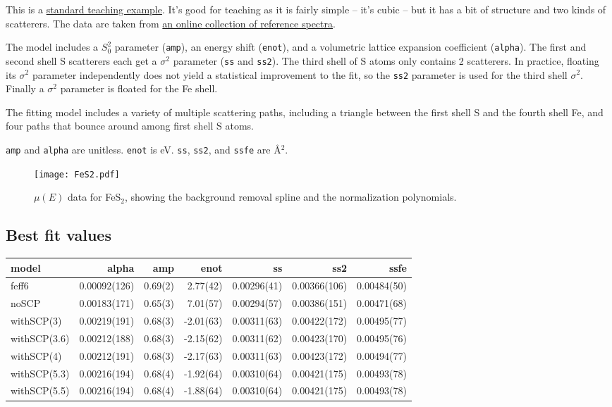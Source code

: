 \documentclass[11pt]{article}
\begin{document}
This is a
\href{https://github.com/bruceravel/XAS-Education/tree/master/Examples/FeS2}{standard
  teaching example}. It's good for teaching as it is fairly simple --
it's cubic -- but it has a bit of structure and two kinds of
scatterers.  The data are taken from
\href{http://cars.uchicago.edu/~newville/ModelLib/search.html}{an
  online collection of reference spectra}.

The model includes a $S_0^2$ parameter (\texttt{amp}), an energy shift
(\texttt{enot}), and a volumetric lattice expansion coefficient
(\texttt{alpha}). The first and second shell S scatterers each get a
$\sigma^2$ parameter (\texttt{ss} and \texttt{ss2}). The third shell
of S atoms only contains 2 scatterers. In practice, floating its
$\sigma^2$ parameter independently does not yield a statistical
improvement to the fit, so the \texttt{ss2} parameter is used for the
third shell $\sigma^2$.  Finally a $\sigma^2$ parameter is floated for
the Fe shell.

The fitting model includes a variety of multiple scattering paths,
including a triangle between the first shell S and the fourth shell
Fe, and four paths that bounce around among first shell S atoms.

\texttt{amp} and \texttt{alpha} are unitless. \texttt{enot} is
eV. \texttt{ss}, \texttt{ss2}, and \texttt{ssfe} are {\AA}$^2$.

\begin{figure}[h]
  \centering
  \texttt{[image: FeS2.pdf]} 
  \caption{$\mu(E)$ data for FeS$_2$, showing the background
    removal spline and the normalization polynomials.}
  \label{fig:fes2-data}
\end{figure}


\subsection{Best fit values}
\label{sec:orgheadline14}

\begin{center}
  \footnotesize
  \begin{tabular}{lrrrrrr}
    model & alpha & amp & enot & ss & ss2 & ssfe\\
    \hline
    feff6        & 0.00092(126) & 0.69(2) &  2.77(42) & 0.00296(41) & 0.00366(106) & 0.00484(50)\\
    noSCP        & 0.00183(171) & 0.65(3) &  7.01(57) & 0.00294(57) & 0.00386(151) & 0.00471(68)\\
    withSCP(3)   & 0.00219(191) & 0.68(3) & -2.01(63) & 0.00311(63) & 0.00422(172) & 0.00495(77)\\
    withSCP(3.6) & 0.00212(188) & 0.68(3) & -2.15(62) & 0.00311(62) & 0.00423(170) & 0.00495(76)\\
    withSCP(4)   & 0.00212(191) & 0.68(3) & -2.17(63) & 0.00311(63) & 0.00423(172) & 0.00494(77)\\
    withSCP(5.3) & 0.00216(194) & 0.68(4) & -1.92(64) & 0.00310(64) & 0.00421(175) & 0.00493(78)\\
    withSCP(5.5) & 0.00216(194) & 0.68(4) & -1.88(64) & 0.00310(64) & 0.00421(175) & 0.00493(78)\\
  \end{tabular}
\end{center}
\end{document}
